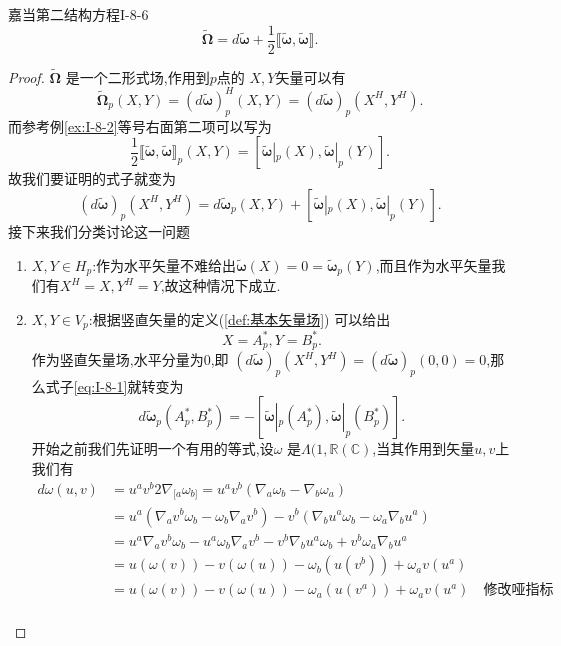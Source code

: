 \documentclass[../main.tex]{subfiles}
\begin{document}
\begin{theorem}
  {嘉当第二结构方程}{I-8-6}\[
 \tilde{\bm{\Omega} } = d \tilde{\bm{\omega} }  + \frac{1}{2} \llbracket \tilde{\bm{\omega} } ,\tilde{\bm{\omega} } \rrbracket 
  .\] 
\end{theorem}
\begin{proof}
  $\tilde{\bm{\Omega} }$ 是一个二形式场,作用到$p$点的 $X,Y$矢量可以有
   \[
  \tilde{\bm{\Omega} }_p(X,Y) = (d\tilde{\bm{\omega} })^H_p(X,Y) = (d\tilde{\bm{\omega} })_p(X^H,Y^H)
  .\] 
  而参考例\ref{ex:I-8-2}等号右面第二项可以写为\[
    \frac{1}{2} \llbracket \tilde{\bm{\omega} } ,\tilde{\bm{\omega} } \rrbracket_p(X,Y) = [\tilde{\bm{\omega} }|_p(X), \tilde{\bm{\omega} }|_p(Y)]
  .\] 
  故我们要证明的式子就变为
  \begin{equation}
    \label{eq:I-8-1}
    (d\tilde{\bm{\omega} })_p(X^H,Y^H) =d \tilde{\bm{\omega} }_p(X,Y)+ [\tilde{\bm{\omega} }|_p(X), \tilde{\bm{\omega} }|_p(Y)]
  .\end{equation}
  接下来我们分类讨论这一问题
  \begin{enumerate}
    \item $X,Y \in H_p$:作为水平矢量不难给出$\bm{\tilde{\omega}}(X) = 0 = \tilde{\bm{\omega} }_p(Y) $,而且作为水平矢量我们有$X^H = X,Y^H = Y$,故这种情况下成立.
    \item  $X,Y \in V_p$:根据竖直矢量的定义(\ref{def:基本矢量场}) 可以给出\[
    X = A^*_p , Y = B^*_p
  .\] 作为竖直矢量场,水平分量为$0$,即 $(d\tilde{\bm{\omega} })_p(X^H,Y^H) = (d\tilde{\bm{\omega} })_p(0,0) = 0$,那么式子\ref{eq:I-8-1}就转变为\[
  d \tilde{\bm{\omega} }_p(A^*_p,B^*_p) = - [\tilde{\bm{\omega} }|_p(A^*_p), \tilde{\bm{\omega} }|_p(B^*_p)]
  .\] 
  开始之前我们先证明一个有用的等式,设$\omega $ 是$\Lambda(1,\mathbb{R}(\mathbb{C})$,当其作用到矢量$u,v$上我们有
   \begin{align*}
     d\omega(u,v) &= u^av^b 2 \nabla_{[a} \omega_{b]} = u^a v^b (\nabla_a \omega_b - \nabla_b \omega_a)\\
                       & = u^a(\nabla_av^b \omega_b - \omega_b \nabla_a v^b) - v^b(\nabla_b u^a\omega_b - \omega_a \nabla _bu^a)\\
                       & = u^a\nabla_av^b \omega_b - u^a\omega_b \nabla_a v^b - v^b\nabla_b u^a\omega_b + v^b\omega_a \nabla _bu^a\\
                       & = u(\omega(v)) - v(\omega(u)) - \omega_b(u(v^b)) + \omega_a v(u^a)\\
                       & = u(\omega(v)) - v(\omega(u)) -\omega_a(u(v^a)) + \omega_a v(u^a) \quad \text{修改哑指标}\\

\end{align*}
\end{enumerate}
\end{proof}
\end{document}
